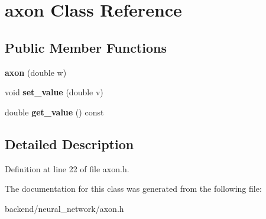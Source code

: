 \hypertarget{classaxon}{}\section{axon Class Reference}
\label{classaxon}
\subsection*{Public Member Functions}
\begin{DoxyCompactItemize}
\item 
\mbox{\label{classaxon_a43c15789a30c17884094ec0fa1905958}} 
{\bfseries axon} (double w)
\item 
\mbox{\label{classaxon_aaba6ceea9994fe5e18dc6f71f8a662ee}} 
void {\bfseries set\+\_\+value} (double v)
\item 
\mbox{\label{classaxon_a0c7d1068cc20ceec501edd225b17335d}} 
double {\bfseries get\+\_\+value} () const
\end{DoxyCompactItemize}


\subsection{Detailed Description}


Definition at line 22 of file axon.\+h.



The documentation for this class was generated from the following file\+:\begin{DoxyCompactItemize}
\item 
backend/neural\+\_\+network/axon.\+h\end{DoxyCompactItemize}
